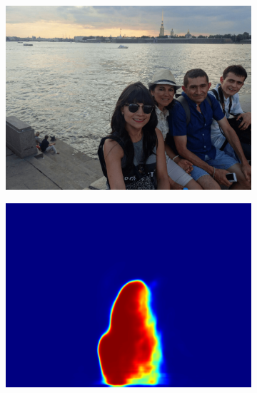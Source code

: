 \begin{figure}
	\centering
    \begin{subfigure}[b]{0.25\columnwidth}
            \centering
            \includegraphics[width=\textwidth]{./figures/sample_image.png}
    \label{subfig:original_img}
    \end{subfigure}
    \begin{subfigure}[b]{0.25\columnwidth}
            \centering
            \includegraphics[width=\textwidth]{./figures/Mask_1.png}
    \label{subfig:woman_left}
    \end{subfigure}
     \begin{subfigure}[b]{0.25\columnwidth}

\end{subfigure}
\end{figure}
